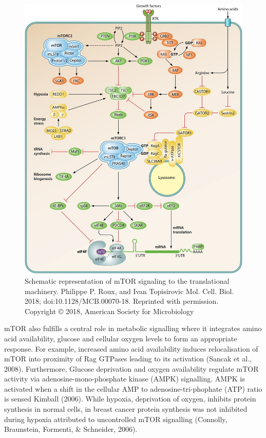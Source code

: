 \documentclass[
  12pt,
  openany]{book}
\begin{document}
\begin{figure}
  \includegraphics{./figures/mTORsignal.jpg}
  \caption{Schematic representation of mTOR signaling to the translational machinery. Philippe P. Roux, and Ivan Topisirovic Mol. Cell. Biol. 2018; doi:10.1128/MCB.00070-18. Reprinted with permission. Copyright © 2018, American Society for Microbiology
 \label{fig:mtorsignal}}
\end{figure}

mTOR also fulfills a central role in metabolic signalling where it integrates amino acid availability, glucose and cellular oxygen levels to form an appropriate response. For example, increased amino acid availability induces relocalisation of mTOR into proximity of Rag GTPases leading to its activation (Sancak et al., 2008). Furthermore, Glucose deprivation and oxygen availability regulate mTOR activity via adenosine-mono-phosphate kinase (AMPK) signalling. AMPK is activated when a shift in the cellular AMP to adenosine-tri-phophate (ATP) ratio is sensed Kimball (2006). While hypoxia, deprivation of oxygen, inhibits protein synthesis in normal cells, in breast cancer protein synthesis was not inhibited during hypoxia attributed to uncontrolled mTOR signalling (Connolly, Braunstein, Formenti, \& Schneider, 2006).
\end{document}
